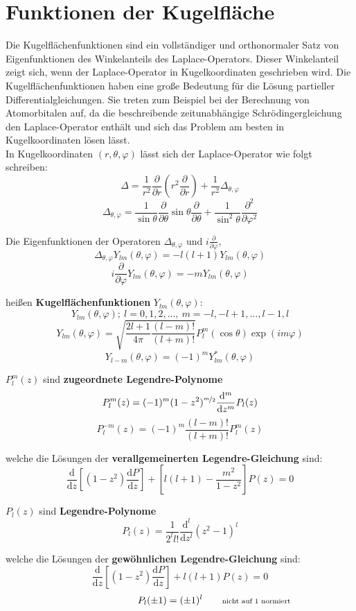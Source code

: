 \documentclass[titlepage,11pt,a4paper,ngerman]{report}
\newcommand{\vphi}{\varphi}
\newcommand{\dd}{\mathrm{d}}
\begin{document}
\section{Funktionen der Kugelfläche}\label{sphericalfunctions}
Die Kugelflächenfunktionen sind ein vollständiger und orthonormaler Satz von Eigenfunktionen des Winkelanteils des Laplace-Operators. Dieser Winkelanteil zeigt sich, wenn der Laplace-Operator in Kugelkoordinaten geschrieben wird. Die Kugelflächenfunktionen haben eine große Bedeutung für die Lösung partieller Differentialgleichungen. Sie treten zum Beispiel bei der Berechnung von Atomorbitalen auf, da die beschreibende zeitunabhängige Schrödingergleichung den Laplace-Operator enthält und sich das Problem am besten in Kugelkoordinaten lösen lässt.\hfill\break
\\
In Kugelkoordinaten $(r,\theta,\varphi)$ lässt sich der Laplace-Operator wie folgt schreiben:
\[\Delta=\frac{1}{r^2}\frac{\partial}{\partial r}\left(r^2\frac{\partial}{\partial r}\right)+\frac{1}{r^2}\Delta_{\theta,\vphi}\]
\[\Delta_{\theta,\vphi}=\frac{1}{\sin\theta}\frac{\partial}{\partial\theta}\sin\theta\frac{\partial}{\partial\theta}+\frac{1}{\sin^2\theta}\frac{\partial^2}{\partial\vphi^2}\]
\noindent

Die Eigenfunktionen der Operatoren $\Delta_{\theta,\varphi}$ und $i\frac{\partial}{\partial\varphi}$,
\[\Delta_{\theta,\vphi}Y_{lm}(\theta,\vphi)=-l(l+1)Y_{lm}(\theta,\vphi)\]
\[i\frac{\partial}{\partial\vphi}Y_{lm}(\theta,\vphi)=-mY_{lm}(\theta,\vphi)\]

heißen \textbf{Kugelflächenfunktionen} $Y_{lm}(\theta,\vphi)$:
\[Y_{lm}(\theta,\vphi);\ l=0,1,2,\ldots,\ m=-l,-l+1,\ldots,l-1,l\]
\[Y_{lm}(\theta,\vphi)=\sqrt{\frac{2l+1}{4\pi}\frac{(l-m)!}{(l+m)!}}P_l^m(\cos\theta)\exp(im\vphi)\]
\[Y_{l-m}(\theta,\vphi)=(-1)^mY_{lm}^*(\theta,\vphi)\]

\noindent
$P_l^m(z)$ sind \textbf{zugeordnete Legendre-Polynome}
\[P_l^m(z)=(-1)^m(1-z^2)^{\nicefrac{m}{2}}\frac{\mathrm{d}^m}{\mathrm{d}z^m}P_l(z)\]
\[P_l^{-m}(z)=(-1)^m\frac{(l-m)!}{(l+m)!}P_l^m(z)\]

welche die Lösungen der  \textbf{verallgemeinerten Legendre-Gleichung} sind:
\[\frac{\dd}{\dd z}\left[(1-z^2)\frac{\dd P}{\dd z}\right]+\left[l(l+1)-\frac{m^2}{1-z^2}\right]P(z)=0\]

\noindent
$P_l(z)$ sind \textbf{Legendre-Polynome}
\[P_l(z)=\frac{1}{2^ll!}\frac{\dd^l}{\dd z^l}(z^2-1)^l\]

welche die Lösungen der  \textbf{gewöhnlichen Legendre-Gleichung} sind:
\[\frac{\dd}{\dd z}\left[(1-z^2)\frac{\dd P}{\dd z}\right]+l(l+1)P(z)=0\]
\[P_l(\pm1)=(\pm1)^l\qquad\rlap{\scriptsize{nicht auf 1 normiert}}\]
\end{document}

